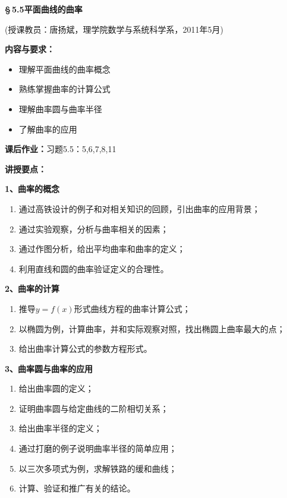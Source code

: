 \documentclass[a4paper]{article}
\begin{document}

%    


\begin{center}
	{\Huge\bf \S\,5.5\;平面曲线的曲率}
	
	(授课教员：唐扬斌，理学院数学与系统科学系，2011年5月)
\end{center}
\vspace{2em}
{\Large\bf 内容与要求：}
\begin{itemize}
  \item 理解平面曲线的曲率概念
  \item 熟练掌握曲率的计算公式
  \item 理解曲率圆与曲率半径
  \item 了解曲率的应用
\end{itemize}

{\Large\bf 课后作业：}习题5.5：5,6,7,8,11

\bigskip

{\Large\bf 讲授要点：}

{\bf 1、曲率的概念}

\begin{enumerate}[(1)]
  \item 通过高铁设计的例子和对相关知识的回顾，引出曲率的应用背景；
  \item 通过实验观察，分析与曲率相关的因素；
  \item 通过作图分析，给出平均曲率和曲率的定义；
  \item 利用直线和圆的曲率验证定义的合理性。   
\end{enumerate}

{\bf 2、曲率的计算}

\begin{enumerate}[(1)]
  \item 推导$y=f(x)$形式曲线方程的曲率计算公式；
  \item 以椭圆为例，计算曲率，并和实际观察对照，找出椭圆上曲率最大的点；
  \item 给出曲率计算公式的参数方程形式。   
\end{enumerate}

{\bf 3、曲率圆与曲率的应用}

\begin{enumerate}[(1)]
  \item 给出曲率圆的定义；
  \item 证明曲率圆与给定曲线的二阶相切关系；
  \item 给出曲率半径的定义；
  \item 通过打磨的例子说明曲率半径的简单应用；
  \item 以三次多项式为例，求解铁路的缓和曲线；
  \item 计算、验证和推广有关的结论。   
\end{enumerate}
\end{document}
